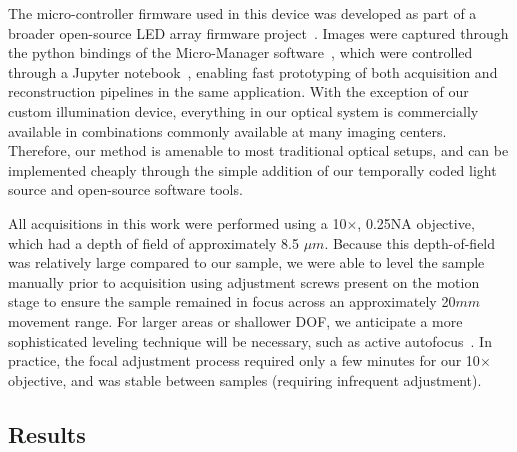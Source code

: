 The micro-controller firmware used in this device was developed as part of a broader open-source LED array firmware project~\cite{illuminate}. Images were captured through the python bindings of the Micro-Manager software~\cite{micromanager}, which were controlled through a Jupyter notebook~\cite{Kluyver:2016aa}, enabling fast prototyping of both acquisition and reconstruction pipelines in the same application. With the exception of our custom illumination device, everything in our optical system is commercially available in combinations commonly available at many imaging centers. Therefore, our method is amenable to most traditional optical setups, and can be implemented cheaply through the simple addition of our temporally coded light source and open-source software tools.

All acquisitions in this work were performed using a 10$\times$, 0.25NA objective, which had a depth of field of approximately 8.5 $\mu m$. Because this depth-of-field was relatively large compared to our sample, we were able to level the sample manually prior to acquisition using adjustment screws present on the motion stage to ensure the sample remained in focus across an approximately 20$mm$ movement range. For larger areas or shallower DOF, we anticipate a more sophisticated leveling technique will be necessary, such as active autofocus~\cite{nikonperfect, zeissdefinite}. In practice, the focal adjustment process required only a few minutes for our 10$\times$ objective, and was stable between samples (requiring infrequent adjustment).

\subsection{Results}\label{sec:highthroughput:results}
